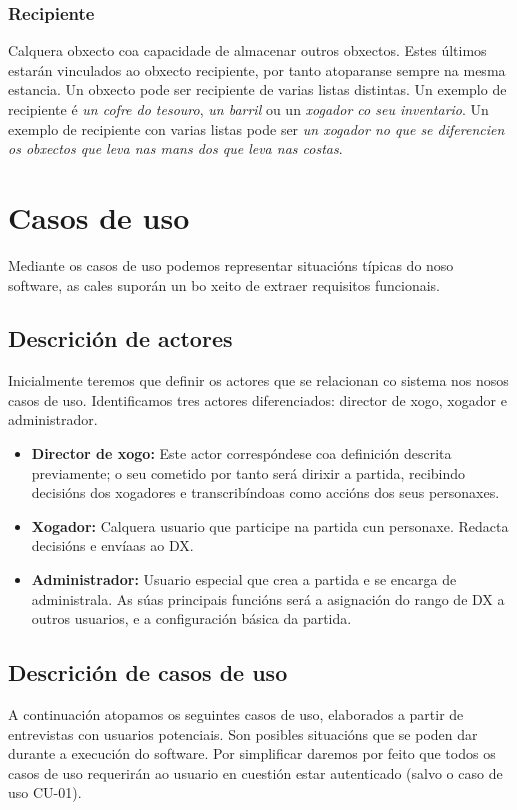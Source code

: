 \subsubsection{Recipiente}
Calquera obxecto coa capacidade de almacenar outros obxectos. Estes últimos estarán vinculados ao obxecto recipiente, por tanto atoparanse sempre na mesma estancia. Un obxecto pode ser recipiente de varias listas distintas.
Un exemplo de recipiente é {\it un cofre do tesouro}, {\it un barril} ou un {\it xogador co seu inventario}. Un exemplo de recipiente con varias listas pode ser {\it un xogador no que se diferencien os obxectos que leva nas mans dos que leva nas costas}.


\section{Casos de uso}
Mediante os casos de uso podemos representar situacións típicas do noso software, as cales suporán un bo xeito de extraer requisitos funcionais.

\subsection{Descrición de actores}
Inicialmente teremos que definir os actores que se relacionan co sistema nos nosos casos de uso. Identificamos tres actores diferenciados: director de xogo, xogador e administrador.
\begin{itemize}
\item {\bf Director de xogo:} Este actor correspóndese coa definición descrita previamente; o seu cometido por tanto será dirixir a partida, recibindo decisións dos xogadores e transcribíndoas como accións dos seus personaxes.
\item {\bf Xogador:} Calquera usuario que participe na partida cun personaxe. Redacta decisións e envíaas ao DX.
\item {\bf Administrador:} Usuario especial que crea a partida e se encarga de administrala. As súas principais funcións será a asignación do rango de DX a outros usuarios, e a configuración básica da partida.
\end{itemize}

\subsection{Descrición de casos de uso}
A continuación atopamos os seguintes casos de uso, elaborados a partir de entrevistas con usuarios potenciais. Son posibles situacións que se poden dar durante a execución do software.
Por simplificar daremos por feito que todos os casos de uso requerirán ao usuario en cuestión estar autenticado (salvo o caso de uso CU-01).

